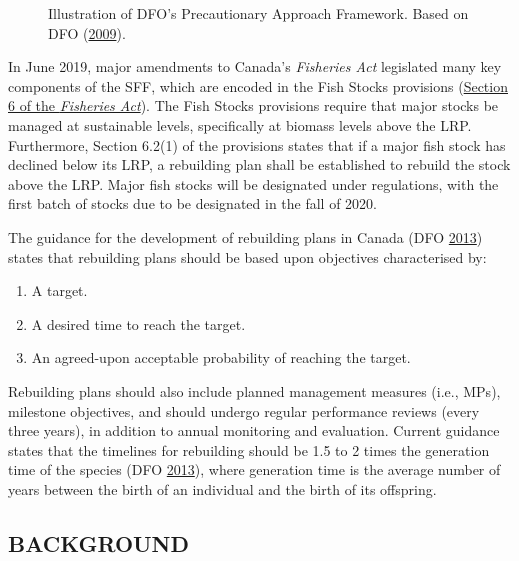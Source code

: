 \documentclass[11pt]{book}
\begin{document}
\begin{figure}[htb]

{\centering {} 

}

\caption{Illustration of DFO's Precautionary Approach Framework. Based on DFO (\protect\hyperlink{ref-dfo2009}{2009}).}\label{fig:pa-illustration}
\end{figure}
In June 2019, major amendments to Canada's \emph{Fisheries Act} legislated many key components of the SFF, which are encoded in the Fish Stocks provisions (\href{https://laws-lois.justice.gc.ca/eng/acts/f-14/page-3.html\#h-1175547}{Section 6 of the \emph{Fisheries Act}}). The Fish Stocks provisions require that major stocks be managed at sustainable levels, specifically at biomass levels above the LRP. Furthermore, Section 6.2(1) of the provisions states that if a major fish stock has declined below its LRP, a rebuilding plan shall be established to rebuild the stock above the LRP. Major fish stocks will be designated under regulations, with the first batch of stocks due to be designated in the fall of 2020.

The guidance for the development of rebuilding plans in Canada (DFO \protect\hyperlink{ref-dfo2013}{2013}) states that rebuilding plans should be based upon objectives characterised by:
\begin{enumerate}
\def\labelenumi{\arabic{enumi}.}

\item
  A target.
\item
  A desired time to reach the target.
\item
  An agreed-upon acceptable probability of reaching the target.
\end{enumerate}
Rebuilding plans should also include planned management measures (i.e., MPs), milestone objectives, and should undergo regular performance reviews (every three years), in addition to annual monitoring and evaluation. Current guidance states that the timelines for rebuilding should be 1.5 to 2 times the generation time of the species (DFO \protect\hyperlink{ref-dfo2013}{2013}), where generation time is the average number of years between the birth of an individual and the birth of its offspring.

\hypertarget{sec:introduction-background}{%
\subsection{BACKGROUND}\label{sec:introduction-background}}
\end{document}
